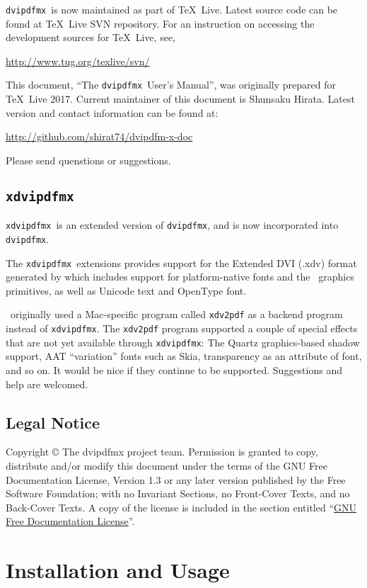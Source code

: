\documentclass[a4paper,xetex,oneside]{book}
\newcommand{\code}[1]{\mbox{\texttt{#1}}}
\newcommand{\dvipdfmx}{\texttt{dvipdfmx}}
\newcommand{\xdvipdfmx}{\texttt{xdvipdfmx}}
\begin{document}
\dvipdfmx\ is now maintained as part of \TeX\ Live. Latest source code can
be found at \TeX\ Live SVN repository. For an instruction on accessing the
development sources for \TeX\ Live, see,\medskip

\url{http://www.tug.org/texlive/svn/}
\medskip

This document, ``The \dvipdfmx\ User's Manual'', was originally prepared for
\TeX\ Live 2017. Current maintainer of this document is Shunsaku Hirata.
Latest version and contact information can be found at:\medskip

\url{http://github.com/shirat74/dvipdfm-x-doc}
\medskip

\noindent{}Please send quenstions or suggestions.

\subsection{\xdvipdfmx}

\xdvipdfmx\ is an extended version of \dvipdfmx, and is now incorporated into
\dvipdfmx.

The \xdvipdfmx\ extensions provides support for the Extended DVI (.xdv) format
generated by \XeTeX which includes support for platform-native fonts and the
\XeTeX\ graphics primitives, as well as Unicode text and OpenType font.

\XeTeX\ originally used a Mac-specific program called \code{xdv2pdf} as a
backend program instead of \xdvipdfmx. The \code{xdv2pdf} program supported
a couple of special effects that are not yet available through \xdvipdfmx:
The Quartz graphics-based shadow support, AAT ``variation'' fonts such as Skia,
transparency as an attribute of font, and so on.
It would be nice if they continue to be supported. Suggestions and help are
welcomed.


\subsection{Legal Notice}

Copyright © The dvipdfmx project team.
Permission is granted to copy, distribute and/or modify this document
under the terms of the GNU Free Documentation License, Version 1.3
or any later version published by the Free Software Foundation;
with no Invariant Sections, no Front-Cover Texts, and no Back-Cover Texts.
A copy of the license is included in the section entitled
``\hyperref[SEC:FDL]{GNU Free Documentation License}''.

\section{Installation and Usage}
\end{document}
